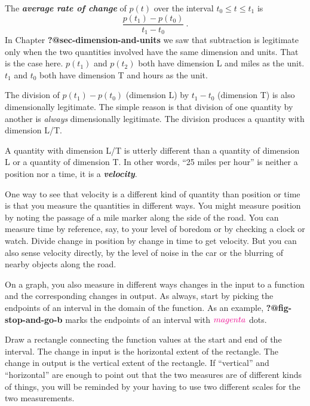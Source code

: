 \documentclass[
  letterpaper,
  DIV=11,
  numbers=noendperiod,
  oneside]{scrreprt}
\begin{document}
The \textbf{\emph{average rate of change}} of \(p(t)\) over the interval
\(t_0 \leq t \leq t_1\) is \[\frac{p(t_1) - p(t_0)}{t_1 - t_0}\ .\] In
Chapter \textbf{?@sec-dimension-and-units} we saw that subtraction is
legitimate only when the two quantities involved have the same dimension
and units. That is the case here. \(p(t_1)\) and \(p(t_2)\) both have
dimension L and miles as the unit. \(t_1\) and \(t_0\) both have
dimension T and hours as the unit.

The division of \(p(t_1) - p(t_0)\) (dimension L) by \(t_1 - t_0\)
(dimension T) is also dimensionally legitimate. The simple reason is
that division of one quantity by another is \emph{always} dimensionally
legitimate. The division produces a quantity with dimension L/T.

A quantity with dimension L/T is utterly different than a quantity of
dimension L or a quantity of dimension T. In other words, ``25 miles per
hour'' is neither a position nor a time, it is a
\textbf{\emph{velocity}}.

One way to see that velocity is a different kind of quantity than
position or time is that you measure the quantities in different ways.
You might measure position by noting the passage of a mile marker along
the side of the road. You can measure time by reference, say, to your
level of boredom or by checking a clock or watch. Divide change in
position by change in time to get velocity. But you can also sense
velocity directly, by the level of noise in the car or the blurring of
nearby objects along the road.

On a graph, you also measure in different ways changes in the input to a
function and the corresponding changes in output. As always, start by
picking the endpoints of an interval in the domain of the function. As
an example, \textbf{?@fig-stop-and-go-b} marks the endpoints of an
interval with \(\color{magenta}{magenta}\) dots.

\marginnote{\begin{footnotesize}

\end{footnotesize}}

Draw a rectangle connecting the function values at the start and end of
the interval. The change in input is the horizontal extent of the
rectangle. The change in output is the vertical extent of the rectangle.
If ``vertical'' and ``horizontal'' are enough to point out that the two
measures are of different kinds of things, you will be reminded by your
having to use two different scales for the two measurements.
\end{document}
